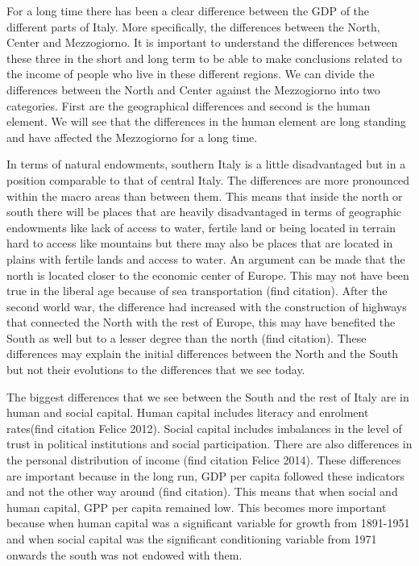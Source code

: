 \documentclass[12pt]{article}
\begin{document}
\begin{spacing}{1.5}

For a long time there has been a clear difference between the GDP of the different parts of Italy. More specifically, the differences between the North, Center and Mezzogiorno. It is important to understand the differences between these three in the short and long term to be able to make conclusions related to the income of people who live in these different regions. We can divide the differences between the North and Center against the Mezzogiorno into two categories. First are the geographical differences and second is the human element. We will see that the differences in the human element are long standing and have affected the Mezzogiorno for a long time.

In terms of natural endowments, southern Italy is a little disadvantaged but in a position comparable to that of central Italy. The differences are more pronounced within the macro areas than between them. This means that inside the north or south there will be places that are heavily disadvantaged in terms of geographic endowments like lack of access to water, fertile land or being located in terrain hard to access like mountains but there may also be places that are located in plains with fertile lands and access to water. An argument can be made that the north is located closer to the economic center of Europe. This may not have been true in the liberal age because of sea transportation (find citation). After the second world war, the difference had increased with the construction of highways that connected the North with the rest of Europe, this may have benefited the South as well but to a lesser degree than the north (find citation). These differences may explain the initial differences between the North and the South but not their evolutions to the differences that we see today.

The biggest differences that we see between the South and the rest of Italy are in human and social capital. Human capital includes literacy and enrolment rates(find citation Felice 2012). Social capital includes imbalances in the level of trust in political institutions and social participation. There are also differences in the personal distribution of income (find citation Felice 2014). These differences are important because in the long run, GDP per capita followed these indicators and not the other way around (find citation). This means that when social and human capital, GPP per capita remained low. This becomes more important because when human capital was a significant variable for growth from 1891-1951 and when social capital was the significant conditioning variable from 1971 onwards the south was not endowed with them.


\end{spacing}
\end{document}
